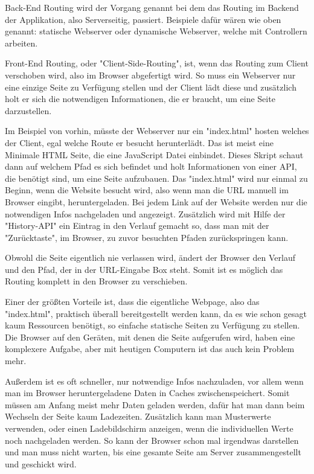 

Back-End Routing wird der Vorgang genannt bei dem das Routing im Backend der Applikation, also Serverseitig, passiert. Beispiele dafür wären wie oben genannt: statische Webserver oder dynamische Webserver, welche mit Controllern arbeiten.


Front-End Routing, oder "Client-Side-Routing", ist, wenn das Routing zum Client verschoben wird, also im Browser abgefertigt wird. So muss ein Webserver nur eine einzige Seite zu Verfügung stellen und der Client lädt diese und zusätzlich holt er sich die notwendigen Informationen, die er braucht, um eine Seite darzustellen.

Im Beispiel von vorhin, müsste der Webserver nur ein "index.html" hosten welches der Client, egal welche Route er besucht herunterlädt. Das ist meist eine Minimale HTML Seite, die eine JavaScript Datei einbindet. Dieses Skript schaut dann auf welchem Pfad es sich befindet und holt Informationen von einer API, die benötigt sind, um eine Seite aufzubauen. Das "index.html" wird nur einmal zu Beginn, wenn die Website besucht wird, also wenn man die URL manuell im Browser eingibt, heruntergeladen. Bei jedem Link auf der Website werden nur die notwendigen Infos nachgeladen und angezeigt. Zusätzlich wird mit Hilfe der "History-API" ein Eintrag in den Verlauf gemacht so, dass man mit der "Zurücktaste", im Browser, zu zuvor besuchten Pfaden zurückspringen kann.

Obwohl die Seite eigentlich nie verlassen wird, ändert der Browser den Verlauf und den Pfad, der in der URL-Eingabe Box steht. Somit ist es möglich das Routing komplett in den Browser zu verschieben.


Einer der größten Vorteile ist, dass die eigentliche Webpage, also das "index.html", praktisch überall bereitgestellt werden kann, da es wie schon gesagt kaum Ressourcen benötigt, so einfache statische Seiten zu Verfügung zu stellen. Die Browser auf den Geräten, mit denen die Seite aufgerufen wird, haben eine komplexere Aufgabe, aber mit heutigen Computern ist das auch kein Problem mehr.

Außerdem ist es oft schneller, nur notwendige Infos nachzuladen, vor allem wenn man im Browser heruntergeladene Daten in Caches zwischenspeichert. Somit müssen am Anfang meist mehr Daten geladen werden, dafür hat man dann beim Wechseln der Seite kaum Ladezeiten. Zusätzlich kann man Musterwerte verwenden, oder einen Ladebildschirm anzeigen, wenn die individuellen Werte noch nachgeladen werden. So kann der Browser schon mal irgendwas darstellen und man muss nicht warten, bis eine gesamte Seite am Server zusammengestellt und geschickt wird.

